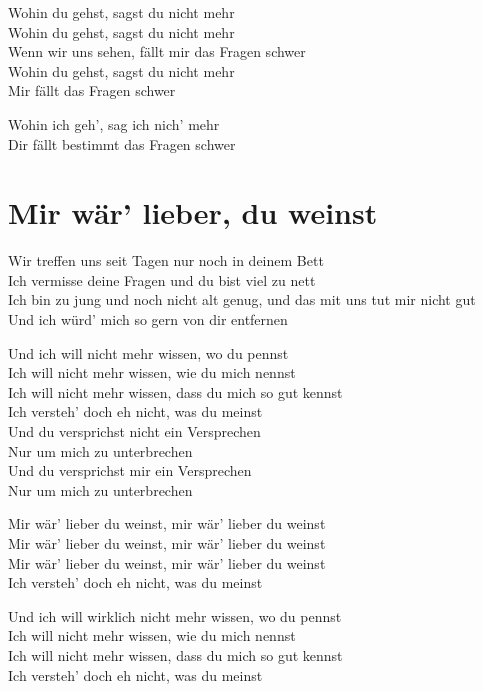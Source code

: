 \documentclass[]{book}
\begin{document}
Wohin du gehst, sagst du nicht mehr\\
Wohin du gehst, sagst du nicht mehr\\
Wenn wir uns sehen, fällt mir das Fragen schwer\\
Wohin du gehst, sagst du nicht mehr\\
Mir fällt das Fragen schwer

Wohin ich geh', sag ich nich' mehr\\
Dir fällt bestimmt das Fragen schwer

\hypertarget{mir-war-lieber-du-weinst}{%
\section{Mir wär' lieber, du weinst}\label{mir-war-lieber-du-weinst}}

Wir treffen uns seit Tagen nur noch in deinem Bett\\
Ich vermisse deine Fragen und du bist viel zu nett\\
Ich bin zu jung und noch nicht alt genug, und das mit uns tut mir nicht gut\\
Und ich würd' mich so gern von dir entfernen

Und ich will nicht mehr wissen, wo du pennst\\
Ich will nicht mehr wissen, wie du mich nennst\\
Ich will nicht mehr wissen, dass du mich so gut kennst\\
Ich versteh' doch eh nicht, was du meinst\\
Und du versprichst nicht ein Versprechen\\
Nur um mich zu unterbrechen\\
Und du versprichst mir ein Versprechen\\
Nur um mich zu unterbrechen

Mir wär' lieber du weinst, mir wär' lieber du weinst\\
Mir wär' lieber du weinst, mir wär' lieber du weinst\\
Mir wär' lieber du weinst, mir wär' lieber du weinst\\
Ich versteh' doch eh nicht, was du meinst

Und ich will wirklich nicht mehr wissen, wo du pennst\\
Ich will nicht mehr wissen, wie du mich nennst\\
Ich will nicht mehr wissen, dass du mich so gut kennst\\
Ich versteh' doch eh nicht, was du meinst
\end{document}
